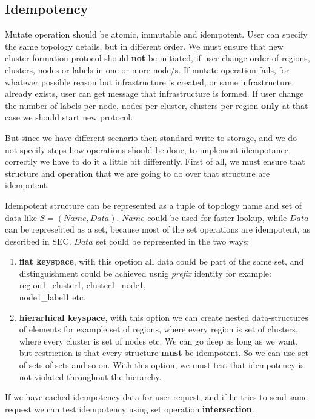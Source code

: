 \subsection{Idempotency}\label{sec:idempotency}
%
Mutate operation should be atomic, immutable and idempotent. User can specify the same topology details, but in different order. We must ensure that new cluster formation protocol should \textbf{not} be initiated, if user change order of regions, clusters, nodes or labels in one or more node/s. If mutate operation fails, for whatever possible reason but infrastructure is created, or same infrastructure already exists, user can get message that infrastructure is formed. If user change the number of labels per node, nodes per cluster, clusters per region \textbf{only} at that case we should start new protocol.

But since we have different scenario then standard write to storage, and we do not specify steps how operations should be done, to implement idempotance correctly we have to do it a little bit differently. First of all, we must ensure that structure and operation that we are going to do over that structure are idempotent.

Idempotent structure can be represented as a tuple of topology name and set of data like $S=(Name, Data)$. $Name$ could be used for faster lookup, while $Data$ can be represebted as a set, because most of the set operations are idempotent, as described in SEC. $Data$ set could be represented in the two ways:

\begin{enumerate}[start=1,label={(\bfseries \arabic*)}]
	\item \textbf{flat keyspace}, with this opetion all data could be part of the same set, and distinguishment could be achieved usnig \textit{prefix} identity for example: region1\_cluster1, cluster1\_node1, \\node1\_label1 etc.
	\item \textbf{hierarhical keyspace}, with this option we can create nested data-structures of elements for example set of regions, where every region is set of clusters, where every cluster is set of nodes etc. We can go deep as long as we want, but restriction is that every structure \textbf{must} be idempotent. So we can use set of sets of sets and so on. With this option, we must test that idempotency is not violated throughout the hierarchy.
\end{enumerate}

If we have cached idempotency data for user request, and if he tries to send same request we can test idempotency using set operation \textbf{intersection}.

